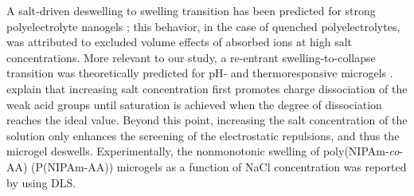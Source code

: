 A salt-driven deswelling to swelling transition has been predicted for strong polyelectrolyte nanogels ;
this behavior, in the case of quenched polyelectrolytes, was attributed to excluded volume effects of absorbed ions at high salt concentrations.
More relevant to our study, a re-entrant swelling-to-collapse transition was theoretically predicted for pH- and thermoresponsive microgels .
 explain that increasing salt concentration first promotes charge dissociation of the weak acid groups until saturation is achieved when the degree of dissociation reaches the ideal value. 
Beyond this point, increasing the salt concentration of the solution only enhances the screening of the electrostatic repulsions, and thus the microgel deswells.
Experimentally, the nonmonotonic swelling of poly(NIPAm-\emph{co}-AA) (P(NIPAm-AA)) microgels as a function of NaCl concentration was reported by  using DLS.
